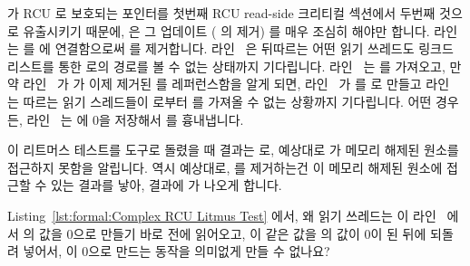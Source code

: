 \begin{lineref}
 가 RCU 로 보호되는 포인터를 첫번째 RCU read-side 크리티컬 섹션에서
두번째 것으로 유출시키기 때문에,  은 그 업데이트 ( 의 제거) 를
매우 조심히 해야만 합니다.
라인~ 는  를  에 연결함으로써  를 제거합니다.
라인~ 은 뒤따르는 어떤 읽기 쓰레드도 링크드 리스트를 통한
 로의 경로를 볼 수 없는 상태까지 기다립니다.
라인~ 는  를 가져오고, 만약 라인~ 가
 가 이제 제거된  를 레퍼런스함을 알게 되면,
라인~ 가  를  로 만들고
라인~ 는 따르는 읽기 스레드들이  로부터  를 가져올
수 없는 상황까지 기다립니다.
어떤 경우든, 라인~ 는  에 0을 저장해서  를
흉내냅니다.
\iffalse

Because \co{P0()} leaks an RCU-protected pointer from its first
RCU read-side critical section to its second, \co{P1()} must carry
out its update (removing \co{x}) very carefully.
Line~\lnref{updremove} removes \co{x} by linking \co{w} to \co{y}.
Line~\lnref{updsync1} waits for readers, after which no subsequent reader
has a path to \co{x} via the linked list.
Line~\lnref{updrdcache} fetches \co{c}, and if line~\lnref{updckcache}
determines that \co{c} references the newly removed \co{x},
line~\lnref{updinitcache} sets \co{c} to \co{NULL}
and line~\lnref{updsync2} again waits for readers, after which no
subsequent reader can fetch \co{x} from \co{c}.
In either case, line~\lnref{updfree} emulates \co{free()} by storing
zero to \co{x}.
\fi

이 리트머스 테스트를  도구로 돌렸을 때 결과는  로, 예상대로
 가 메모리 해제된 원소를 접근하지 못함을 알립니다.
역시 예상대로,  를 제거하는건  이 메모리 해제된
원소에 접근할 수 있는 결과를 낳아,  결과에  가 나오게
합니다.
\iffalse

\QuickQuiz{}
	\begin{lineref}
	Listing~\ref{lst:formal:Complex RCU Litmus Test} 에서, 왜 읽기 쓰레드는
	 이 라인~ 에서  의 값을 0으로 만들기
	바로 전에 읽어오고, 이 같은 값을  의 값이 0이 된 뒤에 되돌려
	넣어서, 이 0으로 만드는 동작을 의미없게 만들 수 없나요?
	\iffalse

	In Listing~\ref{lst:formal:Complex RCU Litmus Test},
	why couldn't a reader fetch \co{c} just before \co{P1()}
	zeroed it on line~\lnref{updinitcache}, and then later
	store this same value back into \co{c} just after it was
	zeroed, thus defeating the zeroing operation?
	\fi
	\end{lineref}
\end{lineref}
